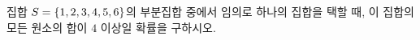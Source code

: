 집합 $S=\{1{,}\mkern3mu\mathopen{}2{,}\mkern3mu\mathopen{}3{,}\mkern3mu\mathopen{}4{,}\mkern3mu\mathopen{}5{,}\mkern3mu\mathopen{}6\}$의 부분집합 중에서 임의로 하나의 집합을 택할 때, 이 집합의 모든 원소의 합이 $4$ 이상일 확률을 구하시오. 
